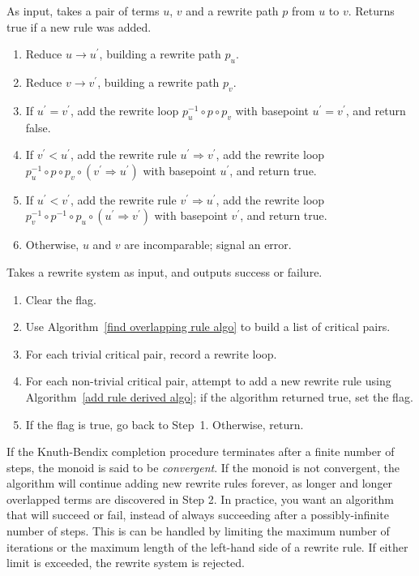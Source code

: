 \documentclass[../generics]{subfiles}
\begin{document}
\begin{algorithm}\label{add rule derived algo}
As input, takes a pair of terms $u$, $v$ and a rewrite path $p$ from $u$ to $v$. Returns true if a new rule was added.
\begin{enumerate}
\item Reduce $u\rightarrow u^\prime$, building a rewrite path $p_u$.
\item Reduce $v\rightarrow v^\prime$, building a rewrite path $p_v$.
\item If $u^\prime=v^\prime$, add the rewrite loop $p_u^{-1}\circ p\circ p_v$ with basepoint $u^\prime=v^\prime$, and return false.
\item If $v^\prime<u^\prime$, add the rewrite rule $u^\prime\Rightarrow v^\prime$, add the rewrite loop $p_u^{-1}\circ p\circ p_v\circ (v^\prime\Rightarrow u^\prime)$ with basepoint $u^\prime$, and return true.
\item If $u^\prime<v^\prime$, add the rewrite rule $v^\prime\Rightarrow u^\prime$, add the rewrite loop $p_v^{-1}\circ p^{-1} \circ p_u \circ (u^\prime\Rightarrow v^\prime)$ with basepoint $v^\prime$, and return true.
\item Otherwise, $u$ and $v$ are incomparable; signal an error.
\end{enumerate}
\end{algorithm}

\begin{algorithm}\label{knuthbendix} Takes a rewrite system as input, and outputs success or failure.
\begin{enumerate}
\item Clear the flag.
\item Use Algorithm~\ref{find overlapping rule algo} to build a list of critical pairs.
\item For each trivial critical pair, record a rewrite loop.
\item For each non-trivial critical pair, attempt to add a new rewrite rule using Algorithm~\ref{add rule derived algo}; if the algorithm returned true, set the flag.
\item If the flag is true, go back to Step~1. Otherwise, return.
\end{enumerate}
\end{algorithm}

If the Knuth-Bendix completion procedure terminates after a finite number of steps, the monoid is said to be \emph{convergent}. If the monoid is not convergent, the algorithm will continue adding new rewrite rules forever, as longer and longer overlapped terms are discovered in Step 2. In practice, you want an algorithm that will succeed or fail, instead of always succeeding after a possibly-infinite number of steps. This is can be handled by limiting the maximum number of iterations or the maximum length of the left-hand side of a rewrite rule. If either limit is exceeded, the rewrite system is rejected.
\end{document}
